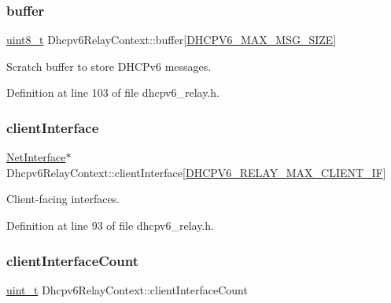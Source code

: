 \subsubsection{\texorpdfstring{buffer}{buffer}}
{\footnotesize\ttfamily \hyperlink{stdint_8h_aba7bc1797add20fe3efdf37ced1182c5}{uint8\+\_\+t} Dhcpv6\+Relay\+Context\+::buffer\mbox{[}\hyperlink{dhcpv6__common_8h_a4b2fa99ee47d1cc91da2b57fa69b324f}{D\+H\+C\+P\+V6\+\_\+\+M\+A\+X\+\_\+\+M\+S\+G\+\_\+\+S\+I\+ZE}\mbox{]}}



Scratch buffer to store D\+H\+C\+Pv6 messages. 



Definition at line 103 of file dhcpv6\+\_\+relay.\+h.

\mbox{\label{structDhcpv6RelayContext_a3781192d09173701e63dcbbb721fe630}} 
\subsubsection{\texorpdfstring{client\+Interface}{clientInterface}}
{\footnotesize\ttfamily \hyperlink{net_8h_a2234db8911a1148c9159979d8f5e0d6b}{Net\+Interface}$\ast$ Dhcpv6\+Relay\+Context\+::client\+Interface\mbox{[}\hyperlink{dhcpv6__relay_8h_a588f9db9b4638a3b196e1421ab1bf6dc}{D\+H\+C\+P\+V6\+\_\+\+R\+E\+L\+A\+Y\+\_\+\+M\+A\+X\+\_\+\+C\+L\+I\+E\+N\+T\+\_\+\+IF}\mbox{]}}



Client-\/facing interfaces. 



Definition at line 93 of file dhcpv6\+\_\+relay.\+h.

\mbox{\label{structDhcpv6RelayContext_a2f2b799fb5c66e195d8cea084afc1116}} 
\subsubsection{\texorpdfstring{client\+Interface\+Count}{clientInterfaceCount}}
{\footnotesize\ttfamily \hyperlink{compiler__port_8h_a12a1e9b3ce141648783a82445d02b58d}{uint\+\_\+t} Dhcpv6\+Relay\+Context\+::client\+Interface\+Count}



